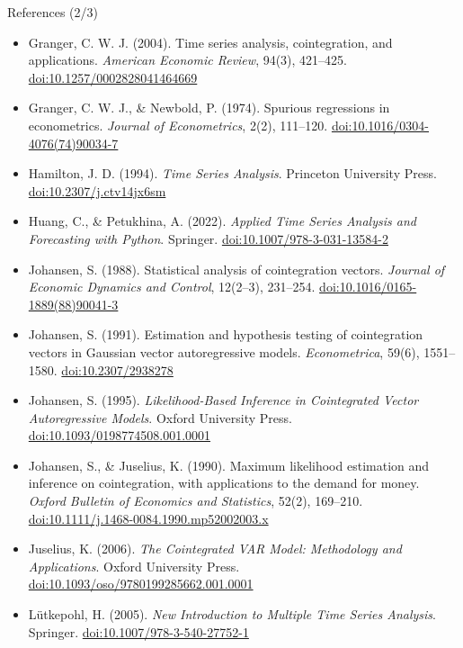\begin{frame}{References (2/3)}
\itemsize{\scriptsize}
\begin{itemize}
    \item Granger, C. W. J. (2004). Time series analysis, cointegration, and applications. \textit{American Economic Review}, 94(3), 421--425. \href{https://doi.org/10.1257/0002828041464669}{doi:10.1257/0002828041464669}
    \item Granger, C. W. J., \& Newbold, P. (1974). Spurious regressions in econometrics. \textit{Journal of Econometrics}, 2(2), 111--120. \href{https://doi.org/10.1016/0304-4076(74)90034-7}{doi:10.1016/0304-4076(74)90034-7}
    \item Hamilton, J. D. (1994). \textit{Time Series Analysis}. Princeton University Press. \href{https://doi.org/10.2307/j.ctv14jx6sm}{doi:10.2307/j.ctv14jx6sm}
    \item Huang, C., \& Petukhina, A. (2022). \textit{Applied Time Series Analysis and Forecasting with Python}. Springer. \href{https://doi.org/10.1007/978-3-031-13584-2}{doi:10.1007/978-3-031-13584-2}
    \item Johansen, S. (1988). Statistical analysis of cointegration vectors. \textit{Journal of Economic Dynamics and Control}, 12(2--3), 231--254. \href{https://doi.org/10.1016/0165-1889(88)90041-3}{doi:10.1016/0165-1889(88)90041-3}
    \item Johansen, S. (1991). Estimation and hypothesis testing of cointegration vectors in Gaussian vector autoregressive models. \textit{Econometrica}, 59(6), 1551--1580. \href{https://doi.org/10.2307/2938278}{doi:10.2307/2938278}
    \item Johansen, S. (1995). \textit{Likelihood-Based Inference in Cointegrated Vector Autoregressive Models}. Oxford University Press. \href{https://doi.org/10.1093/0198774508.001.0001}{doi:10.1093/0198774508.001.0001}
    \item Johansen, S., \& Juselius, K. (1990). Maximum likelihood estimation and inference on cointegration, with applications to the demand for money. \textit{Oxford Bulletin of Economics and Statistics}, 52(2), 169--210. \href{https://doi.org/10.1111/j.1468-0084.1990.mp52002003.x}{doi:10.1111/j.1468-0084.1990.mp52002003.x}
    \item Juselius, K. (2006). \textit{The Cointegrated VAR Model: Methodology and Applications}. Oxford University Press. \href{https://doi.org/10.1093/oso/9780199285662.001.0001}{doi:10.1093/oso/9780199285662.001.0001}
    \item Lütkepohl, H. (2005). \textit{New Introduction to Multiple Time Series Analysis}. Springer. \href{https://doi.org/10.1007/978-3-540-27752-1}{doi:10.1007/978-3-540-27752-1}
\end{itemize}
\end{frame}

